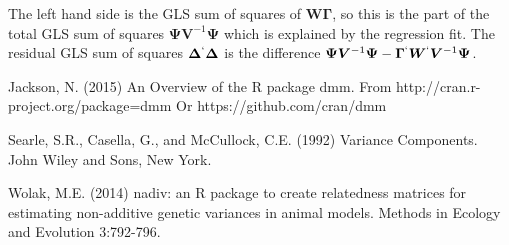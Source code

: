 \documentclass[titlepage,a4paper,12pt]{article}  %
\begin{document}
The left hand side is the GLS sum of squares of $\bm{W} \bm{\Gamma}$, so this is the part of the total GLS sum of squares $\bm{\Psi} \bm{V}^{-1} \bm{\Psi}$ which is explained by the regression fit. The residual GLS sum of squares $\bm{\Delta}^{`} \bm{\Delta}$ is the difference $\bm{\Psi} \bm{V}^{-1} \bm{\Psi} - \bm{\Gamma}^{`}\bm{W}^{`} \bm{V}^{-1} \bm{\Psi}$.


\begin{thebibliography}{99}

Jackson, N. (2015) An Overview of the R package dmm.
    From http://cran.r-project.org/package=dmm 
    Or https://github.com/cran/dmm

Searle, S.R., Casella, G., and McCullock, C.E. (1992) Variance Components.
    John Wiley and Sons, New York.

Wolak, M.E. (2014) nadiv: an R package to create relatedness matrices for
    estimating non-additive genetic variances in animal models.
    Methods in Ecology and Evolution 3:792-796.
\end{thebibliography}
\end{document}
